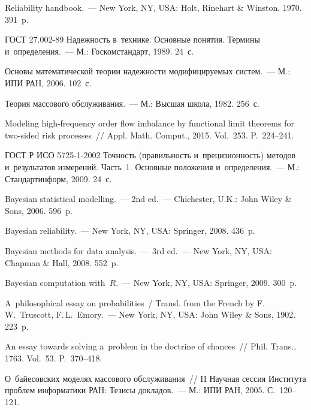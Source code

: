 \begin{multicols}{2}
{{\begin{thebibliography}{99}
Reliability handbook.~---  New York, NY, USA: Holt, Rinehart \& Winston. 1970. 391~p.

ГОСТ 27.002-89 Надежность в~технике. Основные понятия. Термины и~определения.~---
М.: Госкомстандарт, 1989. 24~с.

Основы математической теории надежности модифицируемых сис\-тем.~--- М.: ИПИ РАН, 2006. 102~с.

Теория массового обслуживания.~--- 
М.: Высшая школа, 1982. 256~с.

Modeling high-frequency order flow imbalance by functional limit theorems 
for two-sided risk processes~// Appl. Math. Comput., 2015. Vol.~253. P.~224--241.

ГОСТ Р ИСО 5725-1-2002 Точность (правильность и~прецизионность) 
методов и~результатов измерений. Часть~1. Основные положения 
и~определения.~--- М.: Стандартинформ, 2009. 24~с.

Bayesian statistical modelling.~--- 2nd ed.~--- Chichester, U.K.: John Wiley \& Sons, 2006. 596~p.

Bayesian reliability.~--- New York, NY, USA: Springer, 2008. 436~p.

Bayesian methods for data analysis.~--- 3rd ed.~--- 
New York, NY, USA: Chapman \& Hall, 2008. 552~p.

Bayesian computation with~$R$.~--- New York, NY, USA: Springer, 2009. 300~p.

A~philosophical essay on probabilities~/ 
Transl. from the French by F.\,W.~Truscott, F.\,L.~Emory.~--- 
New York, NY, USA: John Wiley \& Sons, 1902. 223~p.

An essay towards solving a~problem in the doctrine of chances~// 
Phil. Trans., 1763. Vol.~53. P.~370--418.

О~байесовских моделях массового обслуживания~// 
II Научная сессия Института проб\-лем информатики РАН: Тезисы докладов.~--- 
М.: ИПИ РАН, 2005. С.~120--121.


\end{thebibliography}}}
\end{multicols}
